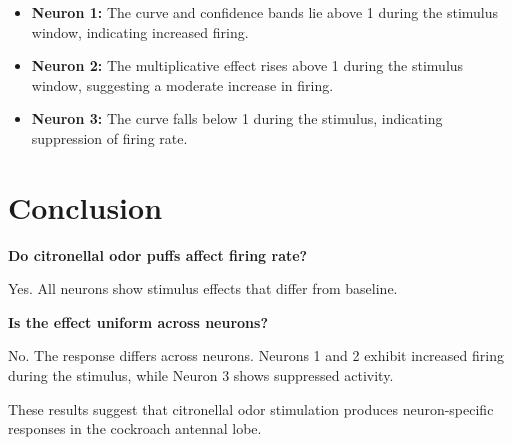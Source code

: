 \documentclass[11pt]{article}
\begin{document}
\begin{itemize}[noitemsep]
\item \textbf{Neuron 1:} The curve and confidence bands lie above 1 during
the stimulus window, indicating increased firing.

\item \textbf{Neuron 2:} The multiplicative effect rises above 1 during the
stimulus window, suggesting a moderate increase in firing.

\item \textbf{Neuron 3:} The curve falls below 1 during the stimulus,
indicating suppression of firing rate.
\end{itemize}

\section*{Conclusion}

\noindent \textbf{Do citronellal odor puffs affect firing rate?}

\noindent Yes. All neurons show stimulus effects that differ from baseline.

\smallskip

\noindent \textbf{Is the effect uniform across neurons?}

\smallskip

\noindent No. The response differs across neurons. Neurons 1 and 2 exhibit
increased firing during the stimulus, while Neuron 3 shows suppressed
activity.

\smallskip

\noindent These results suggest that citronellal odor stimulation produces
neuron-specific responses in the cockroach antennal lobe.
\end{document}
